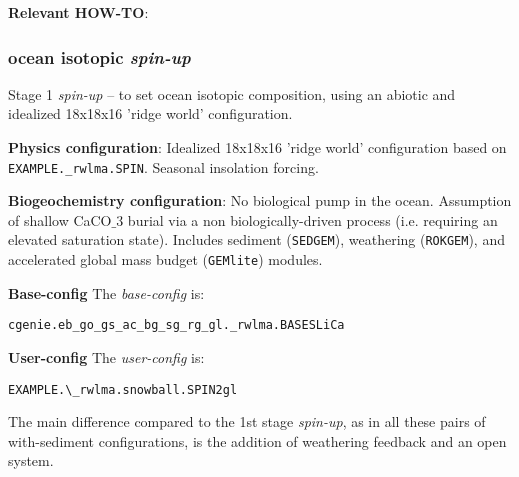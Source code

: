 \documentclass[10pt,twoside]{article}
\begin{document}
\noindent \textbf{Relevant HOW-TO}:


\subsubsection{ocean isotopic \textit{spin-up}}\label{EXAMPLE.rwlma.snowball.SPIN2gl}

Stage 1 \textit{spin-up} -- to set ocean isotopic composition, using an abiotic and idealized 18x18x16 'ridge world' configuration.

\noindent \textbf{Physics configuration}: Idealized 18x18x16 'ridge world' configuration based on \texttt{EXAMPLE.\_rwlma.SPIN}. Seasonal insolation forcing.

\noindent \textbf{Biogeochemistry configuration}: No biological pump in the ocean. Assumption of shallow CaCO$\_{3}$ burial via a non biologically-driven process (i.e. requiring an elevated saturation state). Includes sediment (\texttt{SEDGEM}), weathering (\texttt{ROKGEM}), and accelerated global mass budget (\texttt{GEMlite}) modules.

\noindent \textbf{Base-config} The \textit{base-config} is:
\vspace{-10pt}\begin{verbatim}cgenie.eb_go_gs_ac_bg_sg_rg_gl._rwlma.BASESLiCa\end{verbatim}\vspace{-10pt}

\noindent \textbf{User-config} The \textit{user-config} is:
\vspace{-10pt}\begin{verbatim}EXAMPLE.\_rwlma.snowball.SPIN2gl\end{verbatim}\vspace{-10pt}
The main difference compared to the 1st stage \textit{spin-up}, as in all these pairs of with-sediment configurations, is the addition of weathering feedback and an open system.
\end{document}
